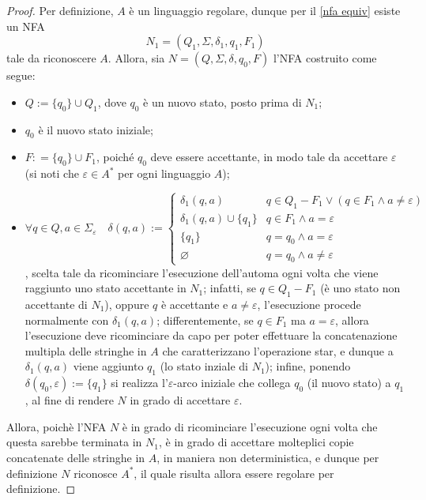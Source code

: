 \documentclass[a4paper, 12pt]{report}
\begin{document}
    \begin{proof}
        Per definizione, $A$ è un linguaggio regolare, dunque per il \cref{nfa equiv} esiste un NFA $$N_1 = (Q_1, \Sigma, \delta_1, q_1, F_1)$$ tale da riconoscere $A$. Allora, sia $N = (Q, \Sigma, \delta, q_0, F)$ l'NFA costruito come segue:

        \begin{itemize}
            \item $Q := \{q_0\} \cup Q_1$, dove $q_0$ è un nuovo stato, posto prima di $N_1$;
            \item $q_0$ è il nuovo stato iniziale;
            \item $F: = \{q_0\} \cup F_1$, poiché $q_0$ deve essere accettante, in modo tale da accettare $\varepsilon$ (si noti che $\varepsilon \in A^*$ per ogni linguaggio $A$);
            \item $\forall q \in Q, a \in \Sigma_\varepsilon \quad \delta(q, a) := \left \{ \begin{array}{ll} \delta_1(q, a) & q \in Q_1 - F_1 \lor (q \in F_1 \land a \neq \varepsilon) \\ \delta_1(q, a) \cup \{q_1\} & q \in F_1 \land a = \varepsilon \\ \{q_1\} & q = q_0 \land a = \varepsilon \\ \varnothing & q = q_0 \land a \neq \varepsilon \end{array} \right.$, scelta tale da ricominciare l'esecuzione dell'automa ogni volta che viene raggiunto uno stato accettante in $N_1$; infatti, se $q \in Q_1 - F_1$ (è uno stato non accettante di $N_1$), oppure $q$ è accettante e $a \neq \varepsilon$, l'esecuzione procede normalmente con $\delta_1(q, a)$; differentemente, se $q \in F_1$ ma $a = \varepsilon$, allora l'esecuzione deve ricominciare da capo per poter effettuare la concatenazione multipla delle stringhe in $A$ che caratterizzano l'operazione star, e dunque a $\delta_1(q, a)$ viene aggiunto $q_1$ (lo stato inziale di $N_1$); infine, ponendo $\delta(q_0, \varepsilon) := \{q_1\}$ si realizza l'$\varepsilon$-arco iniziale che collega $q_0$ (il nuovo stato) a $q_1$, al fine di rendere $N$ in grado di accettare $\varepsilon$.
        \end{itemize}

        
        Allora, poichè l'NFA $N$ è in grado di ricominciare l'esecuzione ogni volta che questa sarebbe terminata in $N_1$, è in grado di accettare molteplici copie concatenate delle stringhe in $A$, in maniera non deterministica, e dunque per definizione $N$ riconosce $A^*$, il quale risulta allora essere regolare per definizione.
    \end{proof}
\end{document}
